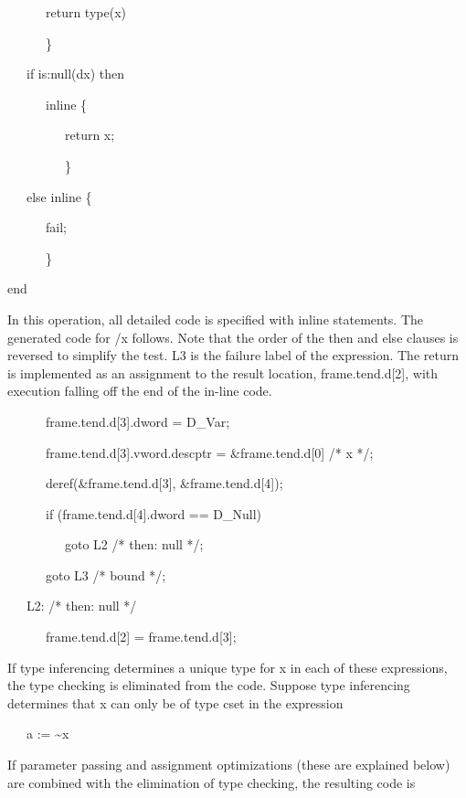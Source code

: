 {\ttfamily\mdseries
\ \ \ \ \ \ return type(x)}

{\ttfamily\mdseries
\ \ \ \ \ \ \}}

{\ttfamily\mdseries
\ \ \ if is:null(dx) then}

{\ttfamily\mdseries
\ \ \ \ \ \ inline \{}

{\ttfamily\mdseries
\ \ \ \ \ \ \ \ \ return x;}

{\ttfamily\mdseries
\ \ \ \ \ \ \ \ \ \}}

{\ttfamily\mdseries
\ \ \ else inline \{}

{\ttfamily\mdseries
\ \ \ \ \ \ fail;}

{\ttfamily\mdseries
\ \ \ \ \ \ \}}

{\ttfamily\mdseries
end}


In this operation, all detailed code is specified with inline
statements. The generated code for /x follows. Note that the order of
the then and else clauses is reversed to simplify the test. L3 is the
failure label of the expression. The return is implemented as an
assignment to the result location, frame.tend.d[2], with execution
falling off the end of the in-line code.

{\ttfamily\mdseries
\ \ \ \ \ \ frame.tend.d[3].dword = D\_Var;}

{\ttfamily\mdseries
\ \ \ \ \ \ frame.tend.d[3].vword.descptr = \&frame.tend.d[0] /* x */;}

{\ttfamily\mdseries
\ \ \ \ \ \ deref(\&frame.tend.d[3], \&frame.tend.d[4]);}

{\ttfamily\mdseries
\ \ \ \ \ \ if (frame.tend.d[4].dword == D\_Null)}

{\ttfamily\mdseries
\ \ \ \ \ \ \ \ \ goto L2 /* then: null */;}

{\ttfamily\mdseries
\ \ \ \ \ \ goto L3 /* bound */;}

{\ttfamily\mdseries
\ \ \ L2: /* then: null */}

{\ttfamily\mdseries
\ \ \ \ \ \ frame.tend.d[2] = frame.tend.d[3];}


If type inferencing determines a unique type for x in each of these
expressions, the type checking is eliminated from the code. Suppose
type inferencing determines that x can only be of type cset in the
expression


\ \ \ a := \~{}x


If parameter passing and assignment optimizations (these are explained
below) are combined with the elimination of type checking, the
resulting code is


